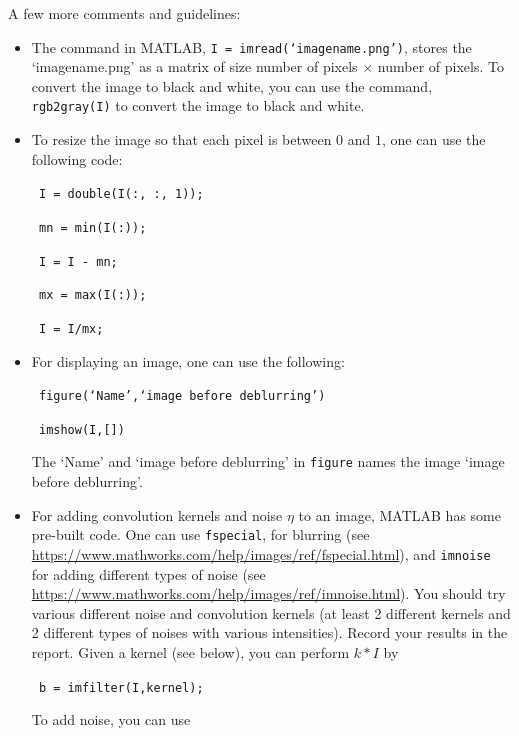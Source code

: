 \documentclass[12pt]{article}
\begin{document}
A few more comments and guidelines:
\begin{itemize}
\item The command in MATLAB, \texttt{I = imread(`imagename.png')}, stores the `imagename.png' as a matrix of size number of pixels $\times$ number of pixels. To convert the image to black and white, you can use the command, \texttt{rgb2gray(I)} to convert the image to black and white. 
\item To resize the image so that each pixel is between $0$ and $1$, one can use the following code:

\texttt{ \hspace{2cm} I = double(I(:, :, 1));}

\texttt{ \hspace{2cm} mn = min(I(:));}

\texttt{ \hspace{2cm}  I = I - mn;}

\texttt{ \hspace{2cm}  mx = max(I(:));}

\texttt{ \hspace{2cm} I = I/mx;}

\item For displaying an image, one can use the following:

\texttt{ \hspace{2cm} figure(`Name',`image before deblurring') }

\texttt{ \hspace{2cm} imshow(I,[]) }

The `Name' and `image before deblurring' in \texttt{figure} names the image `image before deblurring'.

\item For adding convolution kernels and noise $\eta$ to an image, MATLAB has some pre-built code. One can use \texttt{fspecial}, for blurring (see \url{https://www.mathworks.com/help/images/ref/fspecial.html}), and \texttt{imnoise} for adding different types of noise (see \url{https://www.mathworks.com/help/images/ref/imnoise.html}). You should try various different noise and convolution kernels (at least 2 different kernels and 2 different types of noises with various intensities). Record your results in the report. Given a kernel (see below), you can perform $k * I$ by

\texttt{\hspace{2cm} b = imfilter(I,kernel); }

To add noise, you can use


\end{itemize}
\end{document}
